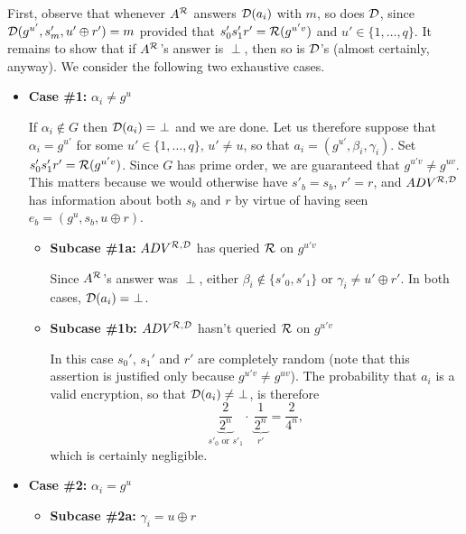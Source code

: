 First, observe that whenever $A^{\mathcal{R}}$ answers $\mathcal{D}(a_i)$ with $m$, so does
$\mathcal{D}$, since $\mathcal{D}(g^{u'}, s'_{m}, u' \oplus r') = m$ provided that
$s'_0s'_1r' = \mathcal{R}(g^{u'v})$ and $u' \in \{1,\ldots,q\}$. It remains to
show that if $A^{\mathcal{R}}$'s answer is $\perp$, then so is $\mathcal{D}$'s (almost
certainly, anyway). We consider the following two exhaustive cases.
\begin{itemize}
\item {\bf Case \#1:} $\alpha_i \neq g^u$

If $\alpha_i \notin G$ then $\fand(a_i) =\ \perp$ and we are done. Let us
therefore suppose that $\alpha_i = g^{u'}$ for some $u' \in \{1,\ldots,q\}$,
$u' \neq u$, so that $a_i = (g^{u'},\beta_i,\gamma_i)$. %
Set $s'_0s'_1r' = \mathcal{R}(g^{u'v})$. Since $G$ has prime order, we are
guaranteed that $g^{u'v} \neq g^{uv}$. This matters because we would otherwise
have $s'_b = s_b$, $r' = r$, and $ADV^{\mathcal{R},\mathcal{D}}$ has information about
both $s_b$ and $r$ by virtue of having seen $e_b = (g^u,s_b,u\oplus r)$.

\begin{itemize}
\item {\bf Subcase \#1a:} $ADV^{\mathcal{R},\mathcal{D}}$ has queried $\mathcal{R}$ on 
$g^{u'v}$

Since $A^{\mathcal{R}}$'s answer was $\perp$, either $\beta_i \notin \{s'_0, s'_1\}$
or $\gamma_i \neq u' \oplus r'$. In both cases, $\fand(a_i) = \ \perp$.
\item {\bf Subcase \#1b:} $ADV^{\mathcal{R},\mathcal{D}}$ hasn't queried $\mathcal{R}$ on 
$g^{u'v}$

In this case $s_0'$, $s_1'$ and $r'$ are completely random (note that this
assertion is justified only because $g^{u'v} \neq g^{uv}$). The probability
that $a_i$ is a valid encryption, so that $\mathcal{D}(a_i) \neq \ \perp$, is
therefore 
\[\underbrace{\frac{2}{2^n}}_{s'_0 \text{ or } s'_1} \cdot \: 
\underbrace{\frac{1}{2^n}}_{r'} = \frac{2}{4^n},
\]
which is certainly negligible.
\end{itemize}

\item {\bf Case \#2:} $\alpha_i = g^u$

\begin{itemize}
\item {\bf Subcase \#2a:} $\gamma_i = u \oplus r$


\end{itemize}
\end{itemize}
